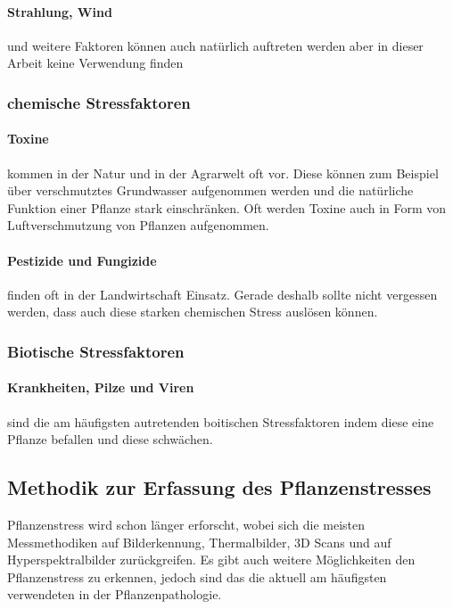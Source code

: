 \paragraph{Strahlung, Wind} und weitere Faktoren können auch natürlich auftreten werden aber in dieser Arbeit keine Verwendung finden 

\subsubsection{chemische Stressfaktoren}

\paragraph{Toxine} kommen in der Natur und in der Agrarwelt oft vor. Diese können zum Beispiel über verschmutztes Grundwasser aufgenommen werden und die natürliche Funktion einer Pflanze stark einschränken. Oft werden Toxine auch in Form von Luftverschmutzung von Pflanzen aufgenommen.

\paragraph{Pestizide und Fungizide} finden oft in der Landwirtschaft Einsatz. Gerade deshalb sollte nicht vergessen werden, dass auch diese starken chemischen Stress auslösen können.

\subsubsection{Biotische Stressfaktoren}

\paragraph{Krankheiten, Pilze und Viren} sind die am häufigsten autretenden boitischen Stressfaktoren indem diese eine Pflanze befallen und diese schwächen.


\subsection{Methodik zur Erfassung des Pflanzenstresses}

Pflanzenstress wird schon länger erforscht, wobei sich die meisten Messmethodiken auf Bilderkennung, Thermalbilder, 3D Scans und auf Hyperspektralbilder zurückgreifen. Es gibt auch weitere Möglichkeiten den Pflanzenstress zu erkennen, jedoch sind das die aktuell am häufigsten verwendeten in der Pflanzenpathologie.
\cite{behmann2015detektion}\cite{messtechniken}

